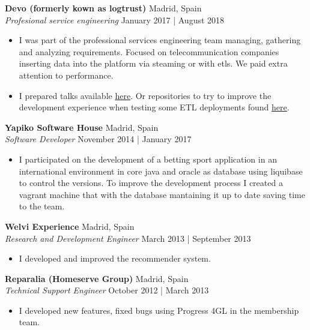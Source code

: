 \documentclass[a4paper]{article}
\begin{document}
\textbf{Devo (formerly kown as logtrust)} \hfill Madrid, Spain\\
\textit{Profesional service engineering} \hfill January 2017 | August 2018\\
\vspace{-1mm}
\begin{itemize} \itemsep 1pt
	\item I was part of the professional services engineering team managing, gathering and analyzing requirements. Focused on telecommunication companies inserting data into the platform via steaming or with etls. We paid extra attention to performance.
	\item I prepared talks available \href{https://github.com/dionisioC/pythonPerformance}{here}. Or repositories to try to improve the development experience when testing some ETL deployments found \href{https://github.com/dionisioC/azkaban_in_vagrant_with_ansible}{here}.
\end{itemize}

\textbf{Yapiko Software House} \hfill Madrid, Spain\\
\textit{Software Developer} \hfill November 2014 | January 2017\\
\vspace{-1mm}
\begin{itemize} \itemsep 1pt
 	\item I participated on the development of a betting sport application in an international environment in core java and oracle as database using liquibase to control the versions. To improve the development process I created a vagrant machine that with the database mantaining it up to date saving time to the team.
\end{itemize}

\textbf{Welvi Experience} \hfill Madrid, Spain\\
\textit{Research and Development Engineer} \hfill March 2013 | September 2013\\
\vspace{-1mm}
\begin{itemize} \itemsep 1pt
	\item I developed and improved the recommender system.
\end{itemize}

\textbf{Reparalia (Homeserve Group)} \hfill Madrid, Spain\\
\textit{Technical Support Engineer} \hfill October 2012 | March 2013\\
\vspace{-1mm}
\begin{itemize} \itemsep 1pt
	\item I developed new features, fixed bugs using Progress 4GL in the membership team.
\end{itemize}
\end{document}
